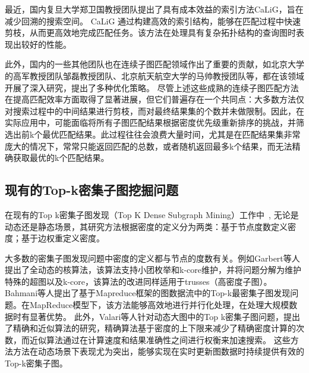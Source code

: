 最近，国内复旦大学郑卫国教授团队提出了具有成本效益的索引方法CaLiG\cite{csm-calig-DBLP:journals/pacmmod/YangZZY23}，旨在减少回溯的搜索空间。
CaLiG 通过构建高效的索引结构，能够在匹配过程中快速剪枝，从而更高效地完成匹配任务。该方法在处理具有复杂拓扑结构的查询图时表现出较好的性能。

此外，国内的一些其他团队也在连续子图匹配领域作出了重要的贡献，如北京大学的高军教授团队邹磊教授团队、北京航天航空大学的马帅教授团队等，都在该领域开展了深入研究，提出了多种优化策略。
尽管上述这些成熟的连续子图匹配方法在提高匹配效率方面取得了显著进展，但它们普遍存在一个共同点：大多数方法仅对搜索过程中的中间结果进行剪枝，而对最终结果集的个数并未做限制。因此，在实际应用中，可能面临将所有子图匹配结果根据密度优先级重新排序的挑战，并筛选出前k个最优匹配结果。此过程往往会浪费大量时间，尤其是在匹配结果集非常庞大的情况下，常常只能返回匹配的总数，或者随机返回最多k个结果，而无法精确获取最优的k个匹配结果。
\subsection{现有的Top-k密集子图挖掘问题}
在现有的Top k密集子图发现（Top K Dense Subgraph Mining）工作中~\cite{dsm-noweight-Bahmani-DBLP:journals/pvldb/BahmaniKV12,dsm-noweight-Balalau-DBLP:conf/wsdm/BalalauBCGS15,dsm-noweight-Bonchi-DBLP:journals/corr/abs-2007-01533,dsm-noweight-Dondi-DBLP:journals/corr/abs-2002-07695,dsm-noweight-Fang-DBLP:journals/pvldb/FangYCLL19,dsm-noweight-Gabert-DBLP:conf/wsdm/GabertPC21,dsm-noweight-Hu-DBLP:conf/cikm/HuWC17,dsm-noweight-Ma-DBLP:journals/pvldb/MaCLH22,dsm-noweight-Mathieu-DBLP:journals/corr/abs-2010-07794,dsm-noweight-McGregor-DBLP:journals/corr/McGregorTVV15,dsm-noweight-Rozenshtein-DBLP:journals/tkdd/RozenshteinTG17,dsm-noweight-Saha-DBLP:journals/corr/abs-2212-08820,dsm-noweight-Tsourakakis-DBLP:conf/kdd/TsourakakisBGGT13,dsm-noweight-Valari-DBLP:conf/ssdbm/ValariKP12,dsm-noweight-Zhao-DBLP:conf/icalip/ZhaoQYB14,dsm-weight-Angel-DBLP:journals/vldb/AngelKSSST14,dsm-weight-Ma-DBLP:conf/icde/MaHWLH17,dsm-weight-Muhammad-DBLP:conf/cikm/NasirGMG17},
无论是动态还是静态场景，其研究方法根据密度的定义分为两类：基于节点度数定义密度；基于边权重定义密度。

大多数的密集子图发现问题中密度的定义都与节点的度数有关。例如Garbert等人\cite{dsm-noweight-Gabert-DBLP:conf/wsdm/GabertPC21}提出了全动态的核算法，该算法支持小团枚举和k-core维护，并将问题分解为维护特殊的超图以及k-core，该算法的改进同样适用于trusses（高密度子图）。Bahmani等人\cite{dsm-noweight-Bahmani-DBLP:journals/pvldb/BahmaniKV12}提出了基于Mapreduce框架的图数据流中的Top-k最密集子图发现问题。在MapReduce模型\cite{csm-mapreduce-DBLP:journals/cacm/DeanG08}下，该方法能够高效地进行并行化处理，在处理大规模数据时有显著优势。
此外，Valari等人\cite{dsm-noweight-Valari-DBLP:conf/ssdbm/ValariKP12}针对动态大图中的Top k密集子图问题，提出了精确和近似算法的研究，精确算法基于密度的上下限来减少了精确密度计算的次数，而近似算法通过在计算速度和结果准确性之间进行权衡来加速搜索。
这些方法方法在动态场景下表现尤为突出，能够实现在实时更新图数据时持续提供有效的Top-k密集子图。

